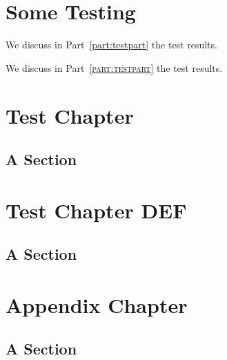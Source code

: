 \documentclass[11pt,paper=b5,footinclude,headinclude]{scrbook} %
\begin{document}

    \tableofcontents


    \chapter{Some Testing}
    We discuss in Part~\ref{part:testpart} the test results.

    We discuss in Part~\textsc{\ref{part:testpart}} the test results.
    \lipsum[1]

    \chapter{Test Chapter }
    \lipsum[1]

    \section{A Section}
    \lipsum[1]

    \chapter{Test Chapter DEF}
    \lipsum[1]

    \section{A Section}
    \lipsum[1]

%   

    \appendix
    \chapter{Appendix Chapter}
    \lipsum[1]

    \section{A Section}
    \lipsum[1]
\end{document}
